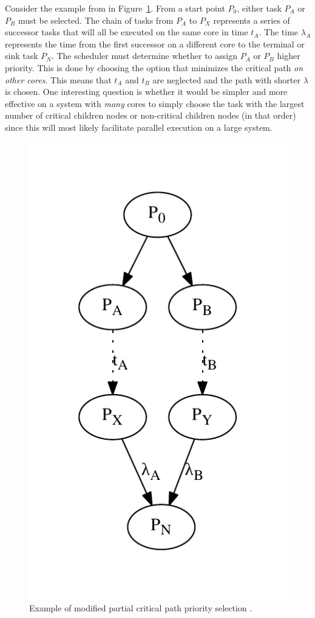 \documentclass{article}
\begin{document}
Consider the example from \cite{eles2000scheduling} in Figure~\ref{f:crit_path}. From a start point $P_0$, either task $P_A$ or $P_B$ must be selected. The chain of tasks from $P_A$ to $P_X$ represents a series of successor tasks that will all be executed on the same core in time $t_A$. The time $\lambda_A$ represents the time from the first successor on a different core to the terminal or sink task $P_N$. The scheduler must determine whether to assign $P_A$ or $P_B$ higher priority. This is done by choosing the option that minimizes the critical path \emph{on other cores}. This means that $t_A$ and $t_B$ are neglected and the path with shorter $\lambda$ is chosen. One interesting question is whether it would be simpler and more effective on a system with \emph{many} cores to simply choose the task with the largest number of critical children nodes or non-critical children nodes (in that order) since this will most likely facilitate parallel execution on a large system.

\begin{figure}[h]
\centering
\includegraphics[scale=0.7]{figures/crit_path}
\caption{Example of modified partial critical path priority selection \cite{eles2000scheduling}.}
\label{f:crit_path}
\end{figure}
\end{document}
